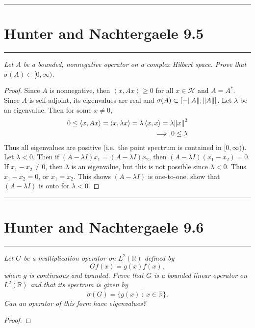 \documentclass{article} %
\theoremstyle{plain}
\def\Rl{\mathbb{R}}
\newcommand{\VEC}[2]{\left\langle #1, #2 \right\rangle}
\newcommand{\ran}{\text{\rm ran }}
\newcommand{\Hilb}{\mathcal{H}}
\newcommand{\problem}[1]{
\vspace{.375cm}
\begin{minipage}{\textwidth}
    \begin{center}
        \noindent\rule{5cm}{1pt}
    \end{center}
    \section{\bf #1}
    \begin{center}
        \noindent\rule{5cm}{1pt}
    \end{center}
    \vspace{0.25cm}
\end{minipage}
}
\numberwithin{equation}{section} %
\numberwithin{figure}{section} %
\numberwithin{table}{section} %
\begin{document}
\problem{Hunter and Nachtergaele 9.5}
\emph{Let $A$ be a bounded, nonnegative operator on a complex Hilbert space.  Prove that $\sigma(A) \subset [0, \infty)$.}
\begin{proof}
    Since $A$ is nonnegative, then $\VEC{x}{Ax} \geq 0$ for all $x \in \Hilb$ and $A = A^*$.  Since $A$ is self-adjoint, its eigenvalues are real and $\sigma(A) \subset \qty[-\norm{A}, \norm{A}]$.  Let $\lambda$ be an eigenvalue.  Then for some $x \neq 0$,
    \begin{align*}
        0 \leq \VEC{x}{Ax} = \VEC{x}{\lambda x} = \lambda \VEC{x}{x} = \lambda \norm{x}^2 \\
        \implies 0 \leq \lambda
    \end{align*}
    Thus all eigenvalues are positive (i.e.~the point spectrum is contained in $[0, \infty)$).  Let $\lambda < 0$.  Then if $(A - \lambda I)x_1 = (A - \lambda I)x_2$, then $(A - \lambda I)(x_1 - x_2) = 0$.  If $x_1 - x_2 \neq 0$, then $\lambda$ is an eigenvalue, but this is not possible since $\lambda < 0$.  Thus $x_1 - x_2 = 0$, or $x_1 = x_2$.  This shows $(A - \lambda I)$ is one-to-one.
    {\color{red} show that $(A - \lambda I)$ is onto for $\lambda < 0$.}
\end{proof}









\problem{Hunter and Nachtergaele 9.6}
\emph{Let $G$ be a multiplication operator on $L^2(\Rl)$ defined by $$Gf(x) = g(x)f(x),$$ where $g$ is continuous and bounded.  Prove that $G$ is a bounded linear operator on $L^2(\Rl)$ and that its spectrum is given by $$\sigma(G) = \overline{\{g(x)\ :\ x \in \Rl\}}.$$  Can an operator of this form have eigenvalues?}
\begin{proof}
\end{proof}
\end{document}
